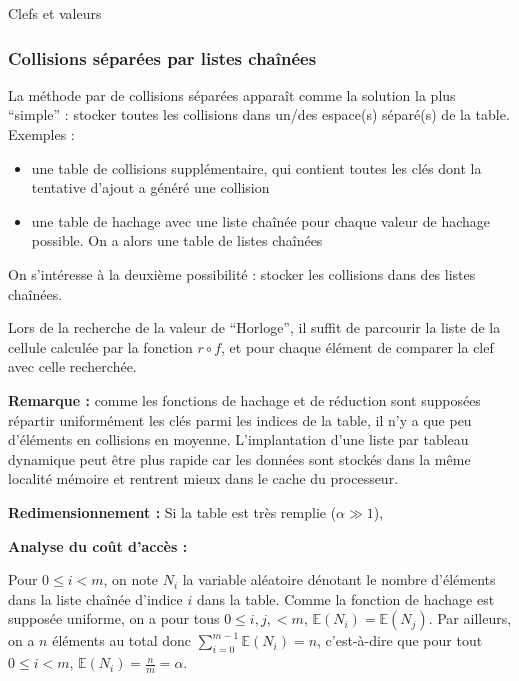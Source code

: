 \documentclass[../../../main.tex]{subfiles}
\begin{document}
\begin{definition}{Clefs et valeurs}
\subsubsection{Collisions séparées par listes chaînées}
La méthode par de collisions séparées apparaît comme la solution la plus ``simple'' : stocker toutes les collisions dans un/des espace(s) séparé(s) de la table. Exemples :
\begin{itemize}
	\item une table de collisions supplémentaire, qui contient toutes les clés dont la tentative d'ajout a généré une collision
	\item une table de hachage avec une liste chaînée pour chaque valeur de hachage possible. On a alors une table de listes chaînées
\end{itemize}
On s'intéresse à la deuxième possibilité : stocker les collisions dans des listes chaînées.

\begin{minipage}{\textwidth}
	\begin{center}
		
	\end{center}
\end{minipage}

Lors de la recherche de la valeur de ``Horloge'', il suffit de parcourir la liste de la cellule calculée par la fonction $r\circ f$, et pour chaque élément de comparer la clef avec celle recherchée.

\textbf{Remarque :} comme les fonctions de hachage et de réduction sont supposées répartir uniformément les clés parmi les indices de la table, il n'y a que peu d'éléments en collisions en moyenne. L'implantation d'une liste par tableau dynamique peut être plus rapide car les données sont stockés dans la même localité mémoire et rentrent mieux dans le cache du processeur.


\textbf{Redimensionnement :} Si la table est très remplie ($\alpha \gg 1$), 

\textbf{Analyse du coût d'accès :}

Pour $0\leq i < m$, on note $N_i$ la variable aléatoire dénotant le nombre d'éléments dans la liste chaînée d'indice $i$ dans la table. Comme la fonction de hachage est supposée uniforme, on a pour tous $0\leq i, j, < m$, $\mathbb{E}(N_i) = \mathbb{E}(N_j)$. Par ailleurs, on a $n$ éléments au total donc $\sum_{i = 0}^{m-1}\mathbb{E}(N_i) = n$, c'est-à-dire que pour tout $0\leq i < m$, $\mathbb{E}(N_i) = \frac{n}{m} = \alpha$.


\end{definition}
\end{document}
